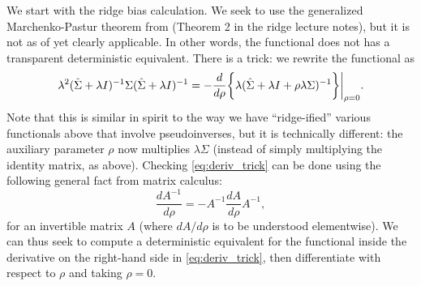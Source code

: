 \documentclass{article}
\begin{document}
We start with the ridge bias calculation. We seek to use the generalized
Marchenko-Pastur theorem from \citet{rubio2011spectral} (Theorem 2 in the ridge
lecture notes), but it is not as of yet clearly applicable. In other words, the
functional  does not has a transparent deterministic equivalent. There
is a trick: we rewrite the functional as 
\begin{equation}
\label{eq:deriv_trick}
\lambda^2 (\hat\Sigma + \lambda I)^{-1} \Sigma (\hat\Sigma + \lambda I)^{-1} = 
-\frac{d}{d\rho} \bigg\{ \lambda (\hat\Sigma + \lambda I + \rho \lambda 
\Sigma)^{-1} \bigg\} \bigg|_{\rho=0}.  
\end{equation}
Note that this is similar in spirit to the way we have ``ridge-ified'' various
functionals above that involve pseudoinverses, but it is technically different:
the auxiliary parameter $\rho$ now multiplies $\lambda \Sigma$ (instead of simply
multiplying the identity matrix, as above). Checking \eqref{eq:deriv_trick} can
be done using the following general fact from matrix calculus: 
\[
\frac{dA^{-1}}{d\rho} = - A^{-1} \frac{dA}{d\rho} A^{-1},
\]
for an invertible matrix $A$ (where $dA/d\rho$ is to be understood
elementwise). We can thus seek to compute a deterministic equivalent for the
functional inside the derivative on the right-hand side in
\eqref{eq:deriv_trick}, then differentiate with respect to $\rho$ and taking 
$\rho=0$. 
\end{document}
